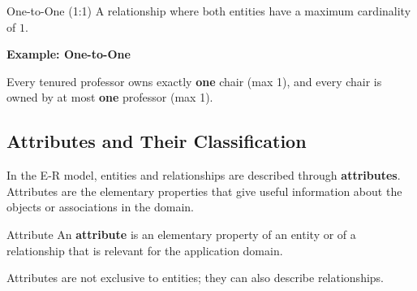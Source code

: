 \pagebreak

\begin{defbox}{One-to-One (1:1)}
A relationship where both entities have a maximum cardinality of $1$.
\end{defbox}

\vspace{0.2cm}
\begin{example}{\textbf{Example: One-to-One}}

    \vs
\begin{center}
\end{center}
Every tenured professor owns exactly \textbf{one} chair (max 1), and every chair is owned by at most \textbf{one} professor (max 1).
\end{example}

\subsection{Attributes and Their Classification}

In the E-R model, entities and relationships are described through \textbf{attributes}. Attributes are the elementary properties that give useful information about the objects or associations in the domain.

\begin{defbox}{Attribute}
An \textbf{attribute} is an elementary property of an entity or of a relationship that is relevant for the application domain.
\end{defbox}

Attributes are not exclusive to entities; they can also describe relationships.

